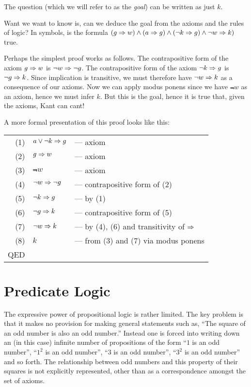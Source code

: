 The question (which we will refer to as the \emph{goal}) can be written
as just $k$.

Want we want to know is, can we deduce the goal from the axioms and the
rules of logic?  In symbols, is the formula
$(g \Rightarrow w) \wedge (a \Rightarrow g) \wedge (\neg{}k \Rightarrow g) \wedge \neg{}w \Rightarrow k)$
true.

Perhaps the simplest proof works as follows.  The contrapositive form of
the axiom $g \Rightarrow w$ is $\neg{}w \Rightarrow \neg{}g$.  The contrapositive form
of the axiom $\neg{}k \Rightarrow g$ is $\neg{}g \Rightarrow k$.  Since implication is
transitive, we must therefore have $\neg{}w \Rightarrow k$ as a consequence of
our axioms.  Now we can apply modus ponens since we have $\Not{w}$ as an
axiom, hence we must infer $k$.  But this is the goal, hence it is true
that, given the axioms, Kant can cant!

A more formal presentation of this proof looks like this:\\
\begin{tabular}{rll}
(1) & $a \vee \neg{}k \Rightarrow g$ & --- axiom \\
(2) & $g \Rightarrow w$ & --- axiom \\
(3) & $\Not{w}$ & --- axiom \\
(4) & $\neg{}w \Rightarrow \neg{}g$ & --- contrapositive form of (2) \\
(5) & $\neg{}k \Rightarrow g$ & --- by (1) \\
(6) & $\neg{}g \Rightarrow k$ & --- contrapositive form of (5) \\
(7) & $\neg{}w \Rightarrow k$ & --- by (4), (6) and transitivity of $\Rightarrow$ \\
(8) & $k$ & --- from (3) and (7) via modus ponens \\
QED \\
\end{tabular}

\section{Predicate Logic}

The expressive power of propositional logic is rather limited.  The key
problem is that it makes no provision for making general statements such
as, ``The square of an odd number is also an odd number.''  Instead one
is forced into writing down an (in this case) infinite number of
propositions of the form ``$1$ is an odd number'', ``$1^2$ is an odd
number'', ``$3$ is an odd number'', ``$3^2$ is an odd number'' and so
forth.  The relationship between odd numbers and this property of their
squares is not explicitly represented, other than as a correspondence
amongst the set of axioms.

